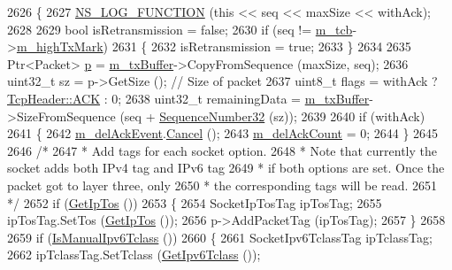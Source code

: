 \begin{DoxyCode}
2626 \{
2627   \hyperlink{log-macros-disabled_8h_a90b90d5bad1f39cb1b64923ea94c0761}{NS\_LOG\_FUNCTION} (\textcolor{keyword}{this} << seq << maxSize << withAck);
2628 
2629   \textcolor{keywordtype}{bool} isRetransmission = \textcolor{keyword}{false};
2630   \textcolor{keywordflow}{if} (seq != \hyperlink{classns3_1_1TcpSocketBase_a26bbaf59001308dc43fb630d76f2e38b}{m\_tcb}->\hyperlink{classns3_1_1TcpSocketState_a2c46f51fd8e2bf43b564ea838b43b8bb}{m\_highTxMark})
2631     \{
2632       isRetransmission = \textcolor{keyword}{true};
2633     \}
2634 
2635   Ptr<Packet> \hyperlink{lte__link__budget_8m_ac9de518908a968428863f829398a4e62}{p} = \hyperlink{classns3_1_1TcpSocketBase_a4a1b53982ffd851bd07ab8d5005c130e}{m\_txBuffer}->CopyFromSequence (maxSize, seq);
2636   uint32\_t sz = p->GetSize (); \textcolor{comment}{// Size of packet}
2637   uint8\_t flags = withAck ? \hyperlink{classns3_1_1TcpHeader_a5f3d432941327854b5ad621e467479c6a1182e63050402c9f49208c62c1ec2d5c}{TcpHeader::ACK} : 0;
2638   uint32\_t remainingData = \hyperlink{classns3_1_1TcpSocketBase_a4a1b53982ffd851bd07ab8d5005c130e}{m\_txBuffer}->SizeFromSequence (seq + 
      \hyperlink{group__network_gacb2070e4e98d2d5135c9bede58f07a03}{SequenceNumber32} (sz));
2639 
2640   \textcolor{keywordflow}{if} (withAck)
2641     \{
2642       \hyperlink{classns3_1_1TcpSocketBase_a5069bf1f5f588a29e858b533d9ff34ab}{m\_delAckEvent}.\hyperlink{classns3_1_1EventId_a993ae94e48e014e1afd47edb16db7a11}{Cancel} ();
2643       \hyperlink{classns3_1_1TcpSocketBase_a7652a3f675c8d56bd5ddc868da70153e}{m\_delAckCount} = 0;
2644     \}
2645 
2646   \textcolor{comment}{/*}
2647 \textcolor{comment}{   * Add tags for each socket option.}
2648 \textcolor{comment}{   * Note that currently the socket adds both IPv4 tag and IPv6 tag}
2649 \textcolor{comment}{   * if both options are set. Once the packet got to layer three, only}
2650 \textcolor{comment}{   * the corresponding tags will be read.}
2651 \textcolor{comment}{   */}
2652   \textcolor{keywordflow}{if} (\hyperlink{classns3_1_1Socket_a95bd4732074d3d26d4a6949fc3499ccb}{GetIpTos} ())
2653     \{
2654       SocketIpTosTag ipTosTag;
2655       ipTosTag.SetTos (\hyperlink{classns3_1_1Socket_a95bd4732074d3d26d4a6949fc3499ccb}{GetIpTos} ());
2656       p->AddPacketTag (ipTosTag);
2657     \}
2658 
2659   \textcolor{keywordflow}{if} (\hyperlink{classns3_1_1Socket_a83858f6116bcdabecf1b63b37514ec8d}{IsManualIpv6Tclass} ())
2660     \{
2661       SocketIpv6TclassTag ipTclassTag;
2662       ipTclassTag.SetTclass (\hyperlink{classns3_1_1Socket_aed62162f0b5f322b1fa23b7350c3c2ce}{GetIpv6Tclass} ());

\end{DoxyCode}
